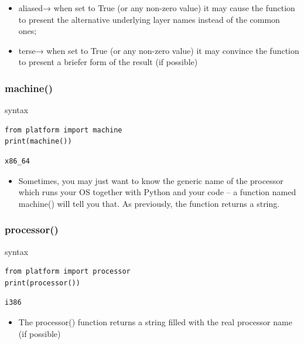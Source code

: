 \documentclass[11pt]{article}
\begin{document}
\begin{itemize}
\item aliased→ when set to True (or any non-zero value) it may cause the
function to present the alternative underlying layer names instead
of the common ones;
\item terse→ when set to True (or any non-zero value) it may convince
the function to present a briefer form of the result (if possible)
\end{itemize}

\subsubsection{machine()}
\label{sec:org2eae2a8}
\begin{description}
\item[{syntax}] 
\end{description}
\begin{verbatim}
from platform import machine
print(machine())
\end{verbatim}

\begin{verbatim}
x86_64
\end{verbatim}

\begin{itemize}
\item Sometimes, you may just want to know the generic name of the
processor which runs your OS together with Python and your code – a
function named machine() will tell you that. As previously, the
function returns a string.
\end{itemize}

\subsubsection{processor()}
\label{sec:org7c32bb8}
\begin{description}
\item[{syntax}] 
\end{description}
\begin{verbatim}
from platform import processor
print(processor())
\end{verbatim}

\begin{verbatim}
i386
\end{verbatim}

\begin{itemize}
\item The processor() function returns a string filled with the real
processor name (if possible)
\end{itemize}
\end{document}
